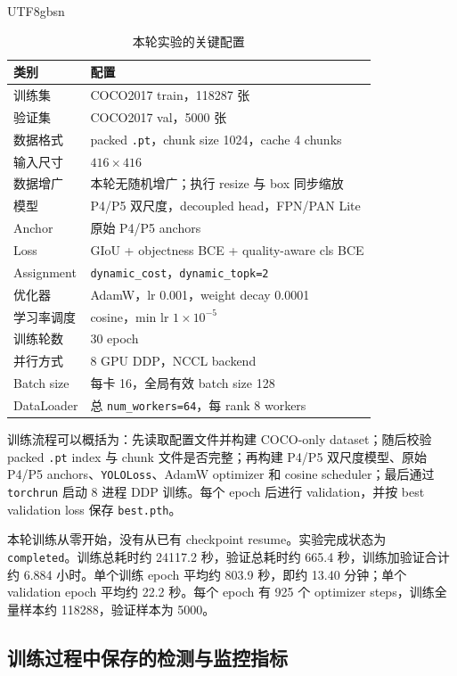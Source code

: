 \documentclass[11pt,a4paper]{article}
\newcommand{\code}[1]{\texttt{#1}}
\begin{document}
\begin{CJK*}{UTF8}{gbsn}
\begin{table}[H]
\centering
\caption{本轮实验的关键配置}
\begin{tabular}{ll}
\toprule
类别 & 配置 \\
\midrule
训练集 & COCO2017 train，118287 张 \\
验证集 & COCO2017 val，5000 张 \\
数据格式 & packed \code{.pt}，chunk size 1024，cache 4 chunks \\
输入尺寸 & $416 \times 416$ \\
数据增广 & 本轮无随机增广；执行 resize 与 box 同步缩放 \\
模型 & P4/P5 双尺度，decoupled head，FPN/PAN Lite \\
Anchor & 原始 P4/P5 anchors \\
Loss & GIoU + objectness BCE + quality-aware cls BCE \\
Assignment & \code{dynamic\_cost}，\code{dynamic\_topk=2} \\
优化器 & AdamW，lr 0.001，weight decay 0.0001 \\
学习率调度 & cosine，min lr $1\times10^{-5}$ \\
训练轮数 & 30 epoch \\
并行方式 & 8 GPU DDP，NCCL backend \\
Batch size & 每卡 16，全局有效 batch size 128 \\
DataLoader & 总 \code{num\_workers=64}，每 rank 8 workers \\
\bottomrule
\end{tabular}
\end{table}

训练流程可以概括为：先读取配置文件并构建 COCO-only dataset；随后校验 packed \code{.pt} index 与 chunk 文件是否完整；再构建 P4/P5 双尺度模型、原始 P4/P5 anchors、\code{YOLOLoss}、AdamW optimizer 和 cosine scheduler；最后通过 \code{torchrun} 启动 8 进程 DDP 训练。每个 epoch 后进行 validation，并按 best validation loss 保存 \code{best.pth}。

本轮训练从零开始，没有从已有 checkpoint resume。实验完成状态为 \code{completed}。训练总耗时约 24117.2 秒，验证总耗时约 665.4 秒，训练加验证合计约 6.884 小时。单个训练 epoch 平均约 803.9 秒，即约 13.40 分钟；单个 validation epoch 平均约 22.2 秒。每个 epoch 有 925 个 optimizer steps，训练全量样本约 118288，验证样本为 5000。

\subsection{训练过程中保存的检测与监控指标}


\end{CJK*}
\end{document}
